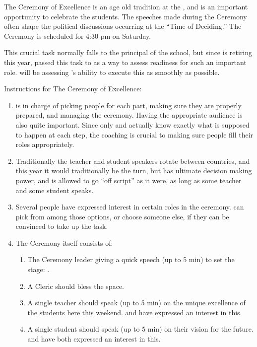 \documentclass[green]{GL2020}
\begin{document}
\name{\gCeremonyOfExcellence{}}

The Ceremony of Excellence is an age old tradition at the \pSchool{}, and is an important opportunity to celebrate the students. The speeches made during the Ceremony often shape the political discussions occurring at the ``Time of Deciding.’’ The Ceremony is scheduled for 4:30 pm on Saturday.

This crucial task normally falls to the principal of the school, but since \cPrincipal{\full} is retiring this year, \cPrincipal{\they} \cPrincipal{\have} passed this task to \cMusic{\full} as a way to assess \cMusic{\their} readiness for such an important role. \cPrincipal{} will be assessing \cMusic{}’s ability to execute this as smoothly as possible.

Instructions for The Ceremony of Excellence:
\begin{enumerate}
  \item \cMusic{} is in charge of picking people for each part, making sure they are properly prepared, and managing the ceremony. Having the appropriate audience is also quite important. Since only \cMusic{} and \cPrincipal{} actually know exactly what is supposed to happen at each step, the coaching is crucial to making sure people fill their roles appropriately.
  \item Traditionally the teacher and student speakers rotate between countries, and this year it would traditionally be the \pShippies{} turn, but \cMusic{} has ultimate decision making power, and is allowed to go ``off script'' as it were, as long as some teacher and some student speaks.
  \item Several people have expressed interest in certain roles in the ceremony. \cMusic{} can pick from among those options, or choose someone else, if they can be convinced to take up the task.
  \item The Ceremony itself consists of:
  \begin{enumerate}
    \item The Ceremony leader giving a quick speech (up to 5 min) to set the stage: \cMusic{}.
    \item A Cleric should bless the space.
    \item A single teacher should speak (up to 5 min) on the unique excellence of the students here this weekend. \cFlowPriest{\full} and \cPirate{\full} have expressed an interest in this.
    \item A single student should speak (up to 5 min) on their vision for the future. \cWarlordDaughter{\full} and \cPirateChild{\full} have both expressed an interest in this.

\end{enumerate}
\end{enumerate}
\end{document}
